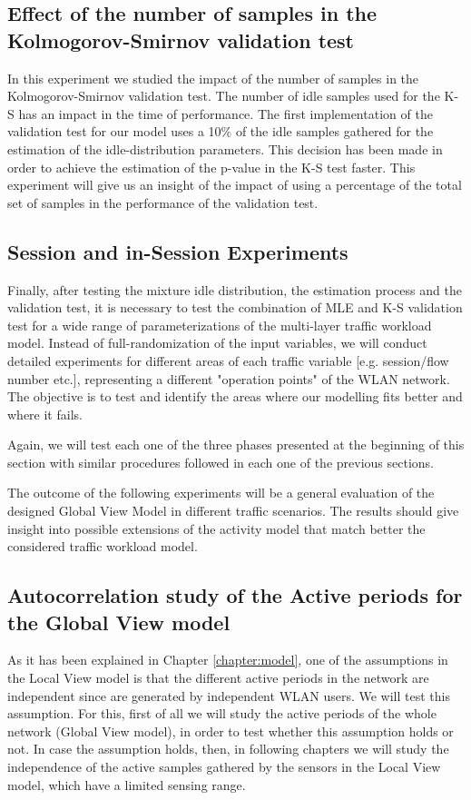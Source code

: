 \subsection{Effect of the number of samples in the Kolmogorov-Smirnov validation test} \label{sec:ks_optimization_presentation}
In this experiment we studied the impact of the number of samples in the Kolmogorov-Smirnov validation test. The number of idle samples used for the \acs{K-S} has an impact in the time of performance. The first implementation of the validation test for our model uses a 10\% of the idle samples gathered for the estimation of the idle-distribution parameters. This decision has been made in order to achieve the estimation of the p-value in the \acs{K-S} test faster. This experiment will give us an insight of the impact of using a percentage of the total set of samples in the performance of the validation test.

\subsection{Session and in-Session Experiments} \label{sec:final_gv}
Finally, after testing the mixture idle distribution, the estimation process and the validation test, it is necessary to test the combination of \acs{MLE} and \acs{K-S} validation test for a wide range of parameterizations of the multi-layer traffic workload model. Instead of full-randomization of the input variables, we will conduct detailed experiments for different areas of each traffic variable [e.g. session/flow number etc.], representing a different "operation points" of the \acs{WLAN} network. The objective is to test and identify the areas where our modelling fits better and where it fails.

Again, we will test each one of the three phases presented at the beginning of this section with similar procedures followed in each one of the previous sections.

The outcome of the following experiments will be a general evaluation of the designed Global View Model in different traffic scenarios. The results should give insight into possible extensions of the activity model that match better the considered traffic workload model.

\subsection{Autocorrelation study of the Active periods for the Global View model} \label{subsec:autocorrelation_active}
As it has been explained in Chapter \ref{chapter:model}, one of the assumptions in the Local View model is that the different active periods in the network are independent since are generated by independent \acs{WLAN} users. We will test this assumption. For this, first of all we will study the active periods of the whole network (Global View model), in order to test whether this assumption holds or not. In case the assumption holds, then, in following chapters we will study the independence of the active samples gathered by the sensors in the Local View model, which have a limited sensing range.

